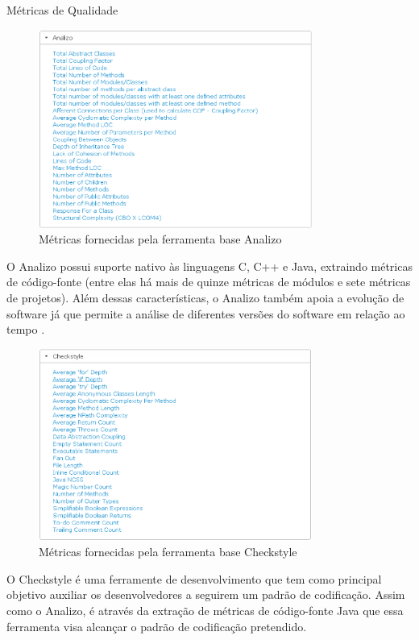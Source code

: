 \begin{section}{Métricas de Qualidade}
\graphicspath{{figuras/}}
\begin{figure}[H]
\centering
\includegraphics[width=0.8\textwidth]{analizo_bt}
\caption{Métricas fornecidas pela ferramenta base Analizo}
\label{fig-analizo_bt}
\end{figure}

O Analizo possui suporte nativo às linguagens C, C++ e Java, extraindo métricas de código-fonte (entre elas há mais de quinze métricas de módulos e sete métricas de projetos). Além dessas características, o Analizo também apoia a evolução de software já que permite a análise de diferentes versões do software em relação ao tempo .

\graphicspath{{figuras/}}
\begin{figure}[H]
\centering
\includegraphics[width=0.8\textwidth]{checkstyle_bt}
\caption{Métricas fornecidas pela ferramenta base Checkstyle}
\label{fig-checkstyle_bt}
\end{figure}

O Checkstyle é uma ferramente de desenvolvimento que tem como principal objetivo auxiliar os desenvolvedores a seguirem um padrão de codificação. Assim como o Analizo, é através da extração de métricas de código-fonte Java que essa ferramenta visa alcançar o padrão de codificação pretendido.


\end{section}
